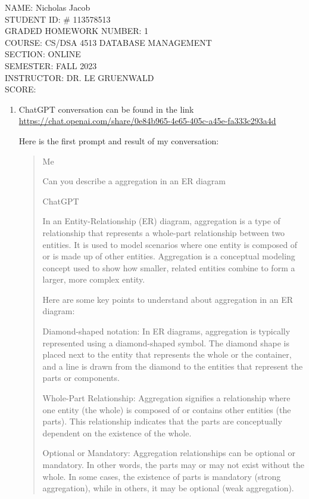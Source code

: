 \documentclass[11pt]{article}
\author{}
\title{}
\begin{document}
{\Large
\noindent NAME:  Nicholas Jacob\\ 
STUDENT ID: \# 113578513\\
GRADED HOMEWORK NUMBER: 1\\
COURSE: CS/DSA 4513 DATABASE MANAGEMENT\\ 
SECTION: ONLINE\\SEMESTER: FALL 2023\\
INSTRUCTOR:  DR. LE GRUENWALD\\
 SCORE:}

\newpage
\begin{enumerate}
\item ChatGPT conversation can be found in the link  \url{https://chat.openai.com/share/0e84b965-4e65-405c-a45e-fa333c293a4d}

Here is the first prompt and result of my conversation:

\begin{quotation}
\noindent Me

Can you describe a aggregation in an ER diagram


\noindent ChatGPT

In an Entity-Relationship (ER) diagram, aggregation is a type of relationship that represents a whole-part relationship between two entities. It is used to model scenarios where one entity is composed of or is made up of other entities. Aggregation is a conceptual modeling concept used to show how smaller, related entities combine to form a larger, more complex entity.

Here are some key points to understand about aggregation in an ER diagram:

    Diamond-shaped notation: In ER diagrams, aggregation is typically represented using a diamond-shaped symbol. The diamond shape is placed next to the entity that represents the whole or the container, and a line is drawn from the diamond to the entities that represent the parts or components.

    Whole-Part Relationship: Aggregation signifies a relationship where one entity (the whole) is composed of or contains other entities (the parts). This relationship indicates that the parts are conceptually dependent on the existence of the whole.

    Optional or Mandatory: Aggregation relationships can be optional or mandatory. In other words, the parts may or may not exist without the whole. In some cases, the existence of parts is mandatory (strong aggregation), while in others, it may be optional (weak aggregation).


\end{quotation}
\end{enumerate}
\end{document}

